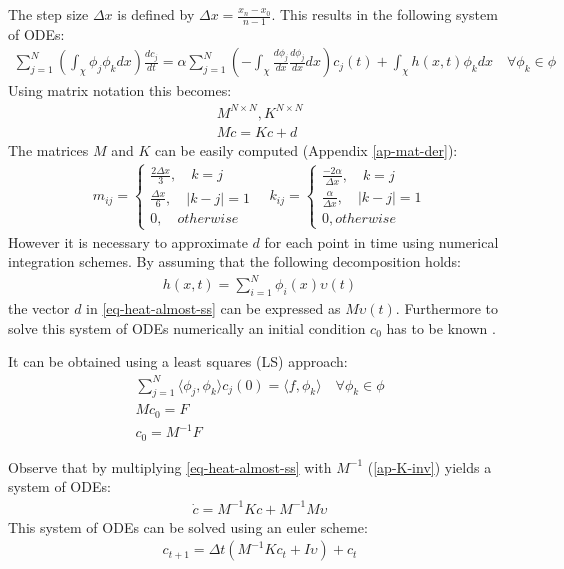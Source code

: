 The step size \(\Delta x\) is defined by \(\Delta x = \frac{x_n - x_0}{n-1}\). \label{def-delta-x}
This results in the following system of ODEs:
\begin{gather}
\sum_{j=1}^N(\int_{\chi} \phi_{j}\phi_{k}dx)\frac{dc_{j}}{dt} = \alpha \sum_{j = 1}^N(-\int_{\chi} \frac{d\phi_{j}}{dx}\frac{d\phi_{j}}{dx}dx)c_{j}(t) + \int_{\chi}h(x, t) \phi_{k} dx
\quad \forall \phi_{k} \in \phi \label{eq-heat-fem}
\end{gather}
Using matrix notation this becomes:
\begin{gather}
M^{N \times N}, K^{N \times N} \\
M\dot{c} = Kc + d \label{eq-heat-almost-ss}
\end{gather}
The matrices \(M\) and \(K\) can be easily computed (Appendix \ref{ap-mat-der}):
\begin{gather}
m_{ij} = \begin{cases}
\frac{2\Delta x}{3}, \quad k = j \\
\frac{\Delta x}{6}, \quad |k - j| = 1 \\
0, \quad otherwise 
\end{cases} \label{def-mat-a}
\quad
k_{ij} = \begin{cases}
\frac{-2\alpha}{\Delta x}, \quad k = j \\
\frac{\alpha}{\Delta x}, \quad |k - j| = 1 \\
0, otherwise
\end{cases}
\end{gather}
However it is necessary to approximate \(d\) for each point in time using numerical integration schemes.
By assuming that the following decomposition holds:
\begin{gather}
h(x, t) = \sum_{i = 1}^{N} \phi_i(x) \upsilon(t)
\end{gather}
the vector \(d\) in \ref{eq-heat-almost-ss} can be expressed as \(M\upsilon(t)\).
Furthermore to solve this system of ODEs numerically an initial condition \(c_{0}\) has to be known 
\cite{Gustafsson2011b}.


It can be obtained using a least squares (LS) approach:
\begin{gather}
\sum_{j = 1}^N \langle \phi_j, \phi_k \rangle c_{j}(0) = \langle f, \phi_{k} \rangle \quad \forall \phi_k \in \phi \\
Mc_{0} = F \label{F}\\ 
c_{0} = M^{-1}F  \label{c0}
\end{gather}
\cite{Gustafsson2011c}

Observe that by multiplying \ref{eq-heat-almost-ss} with \(M^{-1}\) (\ref{ap-K-inv}) yields a system of ODEs:
\begin{gather}
\dot{c} = M^{-1}Kc + M^{-1}M\upsilon \label{almost-almost-ss}
\end{gather}
This system of ODEs can be solved using an euler scheme:
\begin{gather}
c_{t+1} = \Delta t (M^{-1}Kc_{t} + I\upsilon) + c_{t} \label{fem-euler}
\end{gather}
